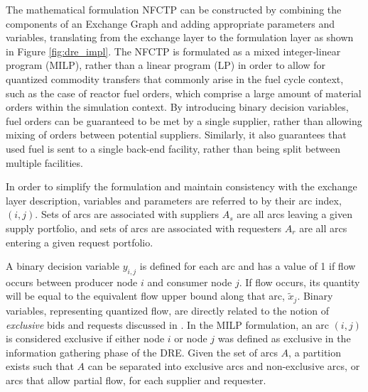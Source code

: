 The mathematical formulation NFCTP can be constructed by combining the
components of an Exchange Graph and adding appropriate parameters and variables,
translating from the exchange layer to the formulation layer as shown in Figure
\ref{fig:dre_impl}. The NFCTP is formulated as a mixed integer-linear program
(MILP), rather than a linear program (LP) in order to allow for quantized
commodity transfers that commonly arise in the fuel cycle context, such as the
case of reactor fuel orders, which comprise a large amount of material orders
within the simulation context. By introducing binary decision variables, fuel
orders can be guaranteed to be met by a single supplier, rather than allowing
mixing of orders between potential suppliers. Similarly, it also guarantees that
used fuel is sent to a single back-end facility, rather than being split between
multiple facilities.


In order to simplify the formulation and maintain consistency with the exchange
layer description, variables and parameters are referred to by their arc index,
$(i, j)$. Sets of arcs are associated with suppliers $A_s$ are all arcs leaving
a given supply portfolio, and sets of arcs are associated with requesters $A_r$
are all arcs entering a given request portfolio.


A binary decision variable $y_{i,j}$ is defined for each arc and has a value of
1 if flow occurs between producer node $i$ and consumer node $j$. If flow
occurs, its quantity will be equal to the equivalent flow upper bound along that
arc, $\tilde{x}_{j}$. Binary variables, representing quantized flow, are
directly related to the notion of \textit{exclusive} bids and requests discussed
in . In the MILP formulation, an arc $(i, j)$ is considered
exclusive if either node $i$ or node $j$ was defined as exclusive in the
information gathering phase of the DRE. Given the set of arcs $A$, a partition
exists such that $A$ can be separated into exclusive arcs and non-exclusive
arcs, or arcs that allow partial flow, for each supplier and requester.

